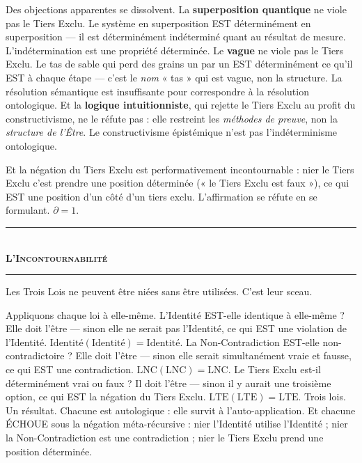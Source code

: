 \documentclass[10pt, openany, oneside]{book}
\renewcommand{\normalsize}{\fontsize{10}{13}\selectfont}
\begin{document}
Des objections apparentes se dissolvent. La \textbf{superposition quantique} ne viole pas le Tiers Exclu. Le système en superposition EST déterminément en superposition --- il est déterminément indéterminé quant au résultat de mesure. L'indétermination est une propriété déterminée. Le \textbf{vague} ne viole pas le Tiers Exclu. Le tas de sable qui perd des grains un par un EST déterminément ce qu'il EST à chaque étape --- c'est le \textit{nom} « tas » qui est vague, non la structure. La résolution sémantique est insuffisante pour correspondre à la résolution ontologique. Et la \textbf{logique intuitionniste}, qui rejette le Tiers Exclu au profit du constructivisme, ne le réfute pas : elle restreint les \textit{méthodes de preuve}, non la \textit{structure de l'Être}. Le constructivisme épistémique n'est pas l'indéterminisme ontologique.

Et la négation du Tiers Exclu est performativement incontournable : nier le Tiers Exclu c'est prendre une position déterminée (« le Tiers Exclu est faux »), ce qui EST une position d'un côté d'un tiers exclu. L'affirmation se réfute en se formulant. $\partial = 1$.

\vspace{1.5em}


\begin{center}
    \rule{0.3\textwidth}{0.4pt}\\[0.5em]
    {\normalsize\bfseries\scshape L'Incontournabilité}\\[0.3em]
    \rule{0.3\textwidth}{0.4pt}
\end{center}

\vspace{1em}

\noindent Les Trois Lois ne peuvent être niées sans être utilisées. C'est leur sceau.

\vspace{0.5em}

\noindent Appliquons chaque loi à elle-même. L'Identité EST-elle identique à elle-même ? Elle doit l'être --- sinon elle ne serait pas l'Identité, ce qui EST une violation de l'Identité. $\text{Identité}(\text{Identité}) = \text{Identité}$. La Non-Contradiction EST-elle non-contradictoire ? Elle doit l'être --- sinon elle serait simultanément vraie et fausse, ce qui EST une contradiction. $\text{LNC}(\text{LNC}) = \text{LNC}$. Le Tiers Exclu est-il déterminément vrai ou faux ? Il doit l'être --- sinon il y aurait une troisième option, ce qui EST la négation du Tiers Exclu. $\text{LTE}(\text{LTE}) = \text{LTE}$. Trois lois. Un résultat. Chacune est autologique : elle survit à l'auto-application. Et chacune ÉCHOUE sous la négation méta-récursive : nier l'Identité utilise l'Identité ; nier la Non-Contradiction est une contradiction ; nier le Tiers Exclu prend une position déterminée.
\end{document}
